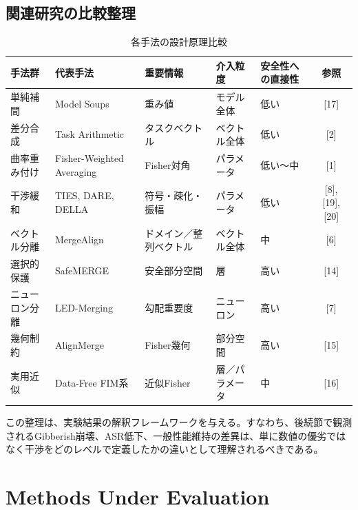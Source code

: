 \documentclass{article}
\begin{document}
\subsection{関連研究の比較整理}
\begin{table}[t]
\centering
\caption{各手法の設計原理比較}
\label{tab:method_comparison}
\small
\begin{tabular}{p{2.0cm}p{2.4cm}p{2.5cm}p{2.0cm}p{2.2cm}c}
\toprule
手法群 & 代表手法 & 重要情報 & 介入粒度 & 安全性への直接性 & 参照 \\
\midrule
単純補間 & Model Soups & 重み値 & モデル全体 & 低い & [17] \\

差分合成 & Task Arithmetic & タスクベクトル & ベクトル全体 & 低い & [2] \\

曲率重み付け & Fisher-Weighted Averaging & Fisher対角 & パラメータ & 低い〜中 & [1] \\

干渉緩和 & TIES, DARE, DELLA & 符号・疎化・振幅 & パラメータ & 低い & [8], [19], [20] \\

ベクトル分離 & MergeAlign & ドメイン／整列ベクトル & ベクトル全体 & 中 & [6] \\

選択的保護 & SafeMERGE & 安全部分空間 & 層 & 高い & [14] \\

ニューロン分離 & LED-Merging & 勾配重要度 & ニューロン & 高い & [7] \\

幾何制約 & AlignMerge & Fisher幾何 & 部分空間 & 高い & [15] \\

実用近似 & Data-Free FIM系 & 近似Fisher & 層／パラメータ & 中 & [16] \\
\bottomrule
\end{tabular}
\end{table}

この整理は、実験結果の解釈フレームワークを与える。すなわち、後続節で観測されるGibberish崩壊、ASR低下、一般性能維持の差異は、単に数値の優劣ではなく干渉をどのレベルで定義したかの違いとして理解されるべきである。

\section{Methods Under Evaluation}
\end{document}
